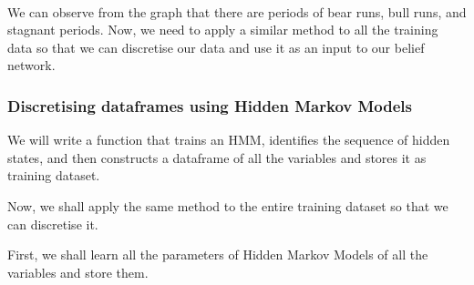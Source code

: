 \documentclass[11pt]{article}
\begin{document}
    \begin{center}
    \end{center}
    { \hspace*{\fill} \\}
    
    We can observe from the graph that there are periods of bear runs, bull
runs, and stagnant periods. Now, we need to apply a similar method to
all the training data so that we can discretise our data and use it as
an input to our belief network.

\hypertarget{discretising-dataframes-using-hidden-markov-models}{%
\subsubsection{Discretising dataframes using Hidden Markov
Models}\label{discretising-dataframes-using-hidden-markov-models}}

We will write a function that trains an HMM, identifies the sequence of
hidden states, and then constructs a dataframe of all the variables and
stores it as training dataset.

    Now, we shall apply the same method to the entire training dataset so
that we can discretise it.

First, we shall learn all the parameters of Hidden Markov Models of all
the variables and store them.
\end{document}
